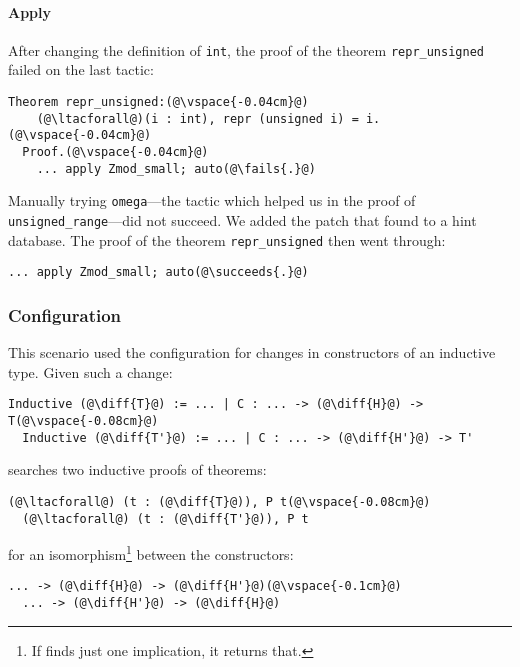 \paragraph{Apply} After changing the definition of \lstinline{int}, the proof of the
theorem \lstinline{repr_unsigned} failed on the last tactic:

\begin{lstlisting}[language=coq]
  Theorem repr_unsigned:(@\vspace{-0.04cm}@)
    (@\ltacforall@)(i : int), repr (unsigned i) = i.(@\vspace{-0.04cm}@)
  Proof.(@\vspace{-0.04cm}@)
    ... apply Zmod_small; auto(@\fails{.}@)
\end{lstlisting}

Manually trying \lstinline{omega}---the tactic which helped us in the proof of \lstinline{unsigned_range}---did not
succeed.
We added the patch that \sysname found to a hint database.
The proof of the theorem \lstinline{repr_unsigned} then went through:

\begin{lstlisting}[language=coq]
  ... apply Zmod_small; auto(@\succeeds{.}@)
\end{lstlisting}

\subsubsection{Configuration}

This scenario used the configuration for changes in constructors of an inductive type.
Given such a change:

\begin{lstlisting}[language=coq]
  Inductive (@\diff{T}@) := ... | C : ... -> (@\diff{H}@) -> T(@\vspace{-0.08cm}@)
  Inductive (@\diff{T'}@) := ... | C : ... -> (@\diff{H'}@) -> T'
\end{lstlisting}
\sysname searches two inductive proofs of theorems:

\begin{lstlisting}[language=coq]
  (@\ltacforall@) (t : (@\diff{T}@)), P t(@\vspace{-0.08cm}@)
  (@\ltacforall@) (t : (@\diff{T'}@)), P t
\end{lstlisting}
for an isomorphism\footnote{If \sysname finds just one implication, it returns that.} between the constructors:

\begin{lstlisting}[language=coq]
  ... -> (@\diff{H}@) -> (@\diff{H'}@)(@\vspace{-0.1cm}@)
  ... -> (@\diff{H'}@) -> (@\diff{H}@)
\end{lstlisting}

